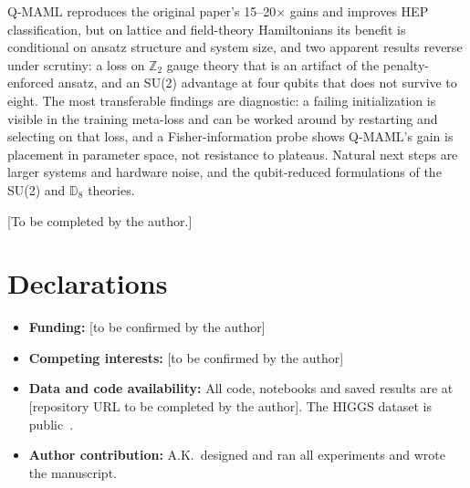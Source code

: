 \documentclass[pdflatex,sn-mathphys-num]{sn-jnl}
\begin{document}
Q-MAML reproduces the original paper's 15--20$\times$ gains and improves HEP classification, but on lattice and field-theory Hamiltonians its benefit is conditional on ansatz structure and system size, and two apparent results reverse under scrutiny: a loss on $\mathbb{Z}_2$ gauge theory that is an artifact of the penalty-enforced ansatz, and an SU(2) advantage at four qubits that does not survive to eight. The most transferable findings are diagnostic: a failing initialization is visible in the training meta-loss and can be worked around by restarting and selecting on that loss, and a Fisher-information probe shows Q-MAML's gain is placement in parameter space, not resistance to plateaus. Natural next steps are larger systems and hardware noise, and the qubit-reduced formulations of the SU(2) and $\mathbb{D}_8$ theories.

\FloatBarrier
\backmatter

[To be completed by the author.]

\section*{Declarations}
\begin{itemize}
\item \textbf{Funding:} [to be confirmed by the author]
\item \textbf{Competing interests:} [to be confirmed by the author]
\item \textbf{Data and code availability:} All code, notebooks and saved results are at [repository URL to be completed by the author]. The HIGGS dataset is public~\cite{baldi2014higgs}.
\item \textbf{Author contribution:} A.K.\ designed and ran all experiments and wrote the manuscript.
\end{itemize}
\end{document}
